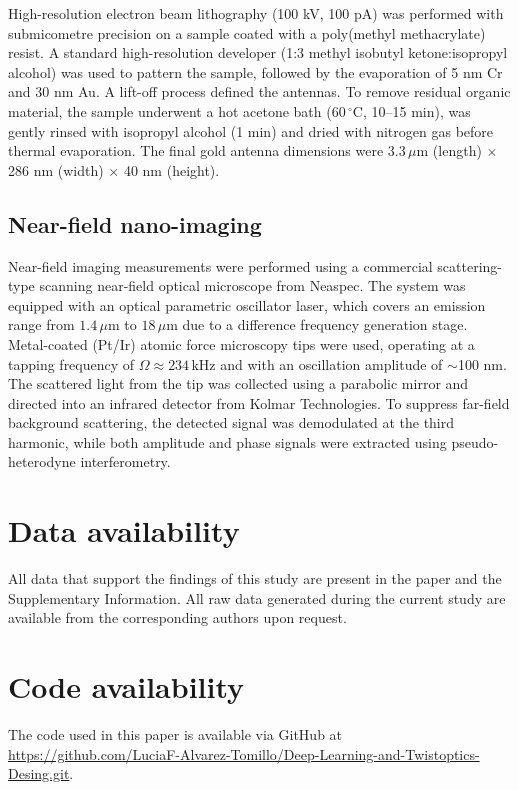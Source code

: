 High-resolution electron beam lithography (100 kV, 100 pA) was performed with submicometre precision on a sample coated with a poly(methyl methacrylate) resist. A standard high-resolution developer (1:3 methyl isobutyl ketone:isopropyl alcohol) was used to pattern the sample, followed by the evaporation of 5 nm Cr and 30 nm Au. A lift-off process defined the antennas. To remove residual organic material, the sample underwent a hot acetone bath ($60\,{}^\circ\mathrm{C}$, 10--15 min), was gently rinsed with isopropyl alcohol (1 min) and dried with nitrogen gas before thermal evaporation. The final gold antenna dimensions were $3.3\,\mu\mathrm{m}$ (length) $\times$ 286 nm (width) $\times$ 40 nm (height).

\subsection{Near-field nano-imaging}

Near-field imaging measurements were performed using a commercial scattering-type scanning near-field optical microscope from Neaspec. The system was equipped with an optical parametric oscillator laser, which covers an emission range from $1.4\,\mu\mathrm{m}$ to $18\,\mu\mathrm{m}$ due to a difference frequency generation stage. Metal-coated (Pt/Ir) atomic force microscopy tips were used, operating at a tapping frequency of $\Omega\approx234\,\mathrm{kHz}$ and with an oscillation amplitude of $\sim$100 nm. The scattered light from the tip was collected using a parabolic mirror and directed into an infrared detector from Kolmar Technologies. To suppress far-field background scattering, the detected signal was demodulated at the third harmonic, while both amplitude and phase signals were extracted using pseudo-heterodyne interferometry.

\section*{Data availability}

All data that support the findings of this study are present in the paper and the Supplementary Information. All raw data generated during the current study are available from the corresponding authors upon request.

\section*{Code availability}

The code used in this paper is available via GitHub at \url{https://github.com/LuciaF-Alvarez-Tomillo/Deep-Learning-and-Twistoptics-Desing.git}.


